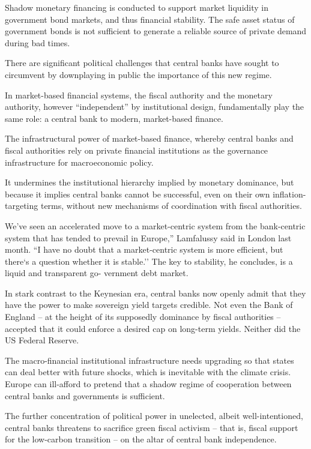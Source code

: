 \documentclass[
]{book}
\begin{document}
Shadow monetary financing is conducted to support market
liquidity in government bond markets, and thus financial stability. The safe asset status of
government bonds is not sufficient to generate a reliable source of private demand during
bad times.

There are significant political challenges that
central banks have sought to circumvent by downplaying in public the importance of this
new regime.

In market-based financial systems, the fiscal authority and the
monetary authority, however ``independent'' by institutional design, fundamentally play the
same role: a central bank to modern, market-based finance.

The infrastructural power of market-based finance,
whereby central banks and fiscal authorities rely on
private financial institutions as the governance infrastructure
for macroeconomic policy.

It undermines the institutional hierarchy implied by monetary dominance,
but because it implies central banks cannot be successful,
even on their own inflation-targeting terms,
without new mechanisms of coordination with fiscal authorities.

We've seen an accelerated move to a market-centric system from the bank-centric
system that has tended to prevail in Europe,'' Lamfalussy said in London last month.
``I have no doubt that a market-centric system is more efficient, but there`s a question
whether it is stable.'' The key to stability, he concludes, is a liquid and transparent go-
vernment debt market.

In stark
contrast to the Keynesian era, central banks now openly admit that they have the power to
make sovereign yield targets credible. Not even the Bank of England -- at the height of its
supposedly dominance by fiscal authorities -- accepted that it could enforce a desired cap on
long-term yields. Neither did the US Federal Reserve.

The macro-financial institutional infrastructure needs upgrading
so that states can deal better with future
shocks, which is inevitable with the climate crisis.
Europe can ill-afford to pretend that a shadow regime of cooperation
between central banks and governments is sufficient.

The further concentration of political power in unelected, albeit well-intentioned,
central banks threatens to sacrifice green fiscal activism -- that is,
fiscal support for the low-carbon transition -- on the altar of central bank independence.
\end{document}
